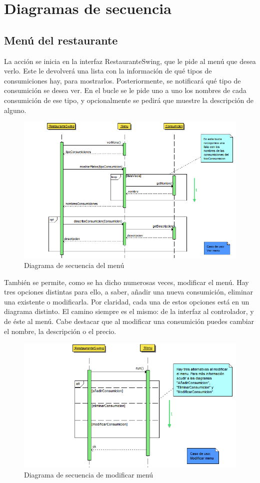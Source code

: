 \documentclass[spanish,a4paper,11pt, twoside]{report}	%
\begin{document}
	\section{Diagramas de secuencia}
		\subsection{Menú del restaurante}
		La acción se inicia en la interfaz RestauranteSwing, que le pide al menú que desea verlo. Este le devolverá una lista con la información de qué tipos de consumiciones hay, para mostrarlos. Posteriormente, se notificará qué tipo de consumición se desea ver. En el bucle se le pide uno a uno los nombres de cada consumición de ese tipo, y opcionalmente se pedirá que muestre la descripción de alguno. 
		\begin{figure}[!h]
		\centering
		\includegraphics[scale=0.5]{DSvermenu.png}
		\caption{Diagrama de secuencia del menú}
		\end{figure}

		También se permite, como se ha dicho numerosas veces, modificar el menú. Hay tres opciones distintas para ello, a saber, añadir una nueva consumición, eliminar una existente o modificarla. Por claridad, cada una de estos opciones está en un diagrama distinto. El camino siempre es el mismo: de la interfaz al controlador, y de éste al menú. Cabe destacar que al modificar una consumición puedes cambiar el nombre, la descripción o el precio.
		\begin{figure}[!h]
		\centering
		\includegraphics[scale=0.5]{DSmodificarmenu.png}
		\caption{Diagrama de secuencia de modificar menú}
		\end{figure}		
\end{document}
